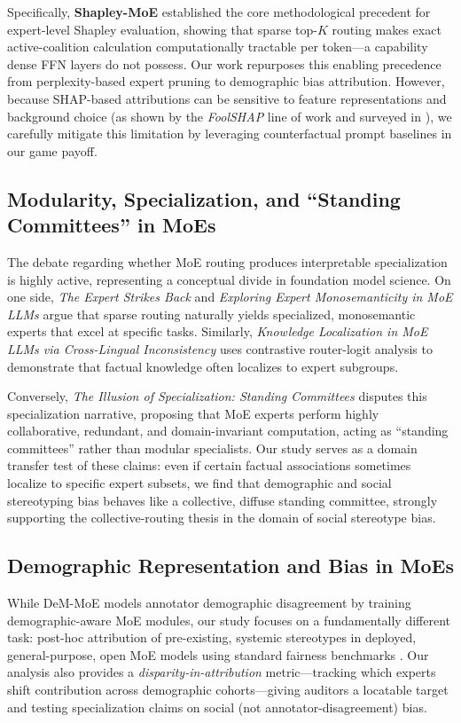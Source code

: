 \documentclass[11pt,a4paper]{article}
\begin{document}
Specifically, \textbf{Shapley-MoE} \cite{shapley_moe} established the core methodological precedent for expert-level Shapley evaluation, showing that sparse top-$K$ routing makes exact active-coalition calculation computationally tractable per token—a capability dense FFN layers do not possess. Our work repurposes this enabling precedence from perplexity-based expert pruning to demographic bias attribution. However, because SHAP-based attributions can be sensitive to feature representations and background choice (as shown by the \textit{FoolSHAP} \cite{foolshap} line of work and surveyed in \cite{bias_survey_2026}), we carefully mitigate this limitation by leveraging counterfactual prompt baselines in our game payoff.

\subsection{Modularity, Specialization, and ``Standing Committees'' in MoEs}
The debate regarding whether MoE routing produces interpretable specialization is highly active, representing a conceptual divide in foundation model science. On one side, \textit{The Expert Strikes Back} \cite{expert_strikes_back} and \textit{Exploring Expert Monosemanticity in MoE LLMs} \cite{exploring_expert_monosemanticity} argue that sparse routing naturally yields specialized, monosemantic experts that excel at specific tasks. Similarly, \textit{Knowledge Localization in MoE LLMs via Cross-Lingual Inconsistency} \cite{knowledge_localization_moe} uses contrastive router-logit analysis to demonstrate that factual knowledge often localizes to expert subgroups. 

Conversely, \textit{The Illusion of Specialization: Standing Committees} \cite{illusion_specialization} disputes this specialization narrative, proposing that MoE experts perform highly collaborative, redundant, and domain-invariant computation, acting as ``standing committees'' rather than modular specialists. Our study serves as a domain transfer test of these claims: even if certain factual associations sometimes localize to specific expert subsets, we find that demographic and social stereotyping bias behaves like a collective, diffuse standing committee, strongly supporting the collective-routing thesis in the domain of social stereotype bias.

\subsection{Demographic Representation and Bias in MoEs}
While DeM-MoE \cite{dem_moe} models annotator demographic disagreement by training demographic-aware MoE modules, our study focuses on a fundamentally different task: post-hoc attribution of pre-existing, systemic stereotypes in deployed, general-purpose, open MoE models using standard fairness benchmarks \cite{stereoset, bbq, winogender}. Our analysis also provides a \textit{disparity-in-attribution} metric---tracking which experts shift contribution across demographic cohorts---giving auditors a locatable target and testing specialization claims on social (not annotator-disagreement) bias.
\end{document}
